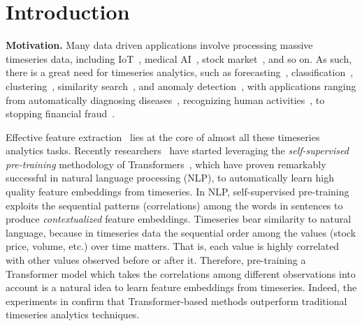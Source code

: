 \section{Introduction}
\label{sec.intro}
\noindent\textbf{Motivation.} Many data driven applications involve processing massive timeseries data, including IoT~\cite{cook2019anomaly}, medical AI~\cite{crabtree1990individual}, stock market~\cite{kraft1977determinants}, and so on. As such, there is a great need for timeseries analytics, such as forecasting~\cite{chatfield2000time}, classification~\cite{ismail2019deep}, clustering~\cite{liao2005clustering}, similarity search~\cite{negi2005time}, and anomaly detection~\cite{teng2010anomaly}, with applications ranging from automatically diagnosing diseases~\cite{bui2017time}, recognizing human activities~\cite{lara2012survey}, to stopping financial fraud~\cite{yue2007review}. 



Effective feature extraction~\cite{paparrizos2019grail} lies at the core of almost all these timeseries analytics tasks. Recently researchers~\cite{DBLP:conf/kdd/ZerveasJPBE21} have started leveraging the {\it self-supervised pre-training} methodology of Transformers~\cite{DBLP:conf/nips/VaswaniSPUJGKP17,DBLP:conf/naacl/DevlinCLT19,brown2020language}, which have proven remarkably successful in natural language processing (NLP), to automatically learn high quality feature embeddings from timeseries. In NLP, self-supervised pre-training exploits the sequential patterns (correlations) among the words in sentences to produce {\it contextualized} feature embeddings. Timeseries bear similarity to natural language, because in timeseries data the sequential order among the values (stock  price, volume, etc.) over time matters. That is, each value is highly correlated with other values observed before or after it. Therefore, pre-training a Transformer model which takes the correlations among different observations into account is a natural idea to learn feature embeddings from timeseries. Indeed, the experiments in \cite{DBLP:conf/kdd/ZerveasJPBE21} confirm that Transformer-based methods outperform traditional timeseries analytics techniques.
 
